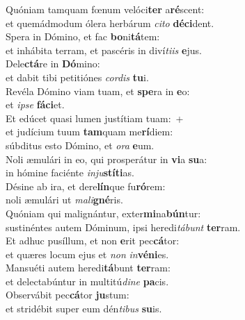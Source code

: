 \evenverse Quóniam tamquam fœnum velóci\textbf{ter} a\textbf{ré}scent:~\*\\
\evenverse et quemádmodum ólera herbárum \textit{ci}\textit{to} \textbf{dé}\textbf{ci}dent.\\
\oddverse Spera in Dómino, et fac \textbf{bo}ni\textbf{tá}tem:~\*\\
\oddverse et inhábita terram, et pascéris in diví\textit{ti}\textit{is} \textbf{e}jus.\\
\evenverse Dele\textbf{ctá}re in \textbf{Dó}mino:~\*\\
\evenverse et dabit tibi petitiónes \textit{cor}\textit{dis} \textbf{tu}i.\\
\oddverse Revéla Dómino viam tuam, et \textbf{spe}ra in \textbf{e}o:~\*\\
\oddverse et \textit{i}\textit{pse} \textbf{fá}\textbf{ci}et.\\
\evenverse Et edúcet quasi lumen justítiam tuam:~+\\
\evenverse  et judícium tuum \textbf{tam}quam me\textbf{rí}diem:~\*\\
\evenverse súbditus esto Dómino, et \textit{o}\textit{ra} \textbf{e}um.\\
\oddverse Noli æmulári in eo, qui prosperátur in \textbf{vi}a \textbf{su}a:~\*\\
\oddverse in hómine faciénte \textit{in}\textit{ju}\textbf{stí}\textbf{ti}as.\\
\evenverse Désine ab ira, et dere\textbf{lín}que fu\textbf{ró}rem:~\*\\
\evenverse noli æmulári ut \textit{ma}\textit{li}\textbf{gné}ris.\\
\oddverse Quóniam qui malignántur, exter\textbf{mi}na\textbf{bún}tur:~\*\\
\oddverse sustinéntes autem Dóminum, ipsi heredi\textit{tá}\textit{bunt} \textbf{ter}ram.\\
\evenverse Et adhuc pusíllum, et non \textbf{e}rit pec\textbf{cá}tor:~\*\\
\evenverse et quæres locum ejus et \textit{non} \textit{in}\textbf{vé}\textbf{ni}es.\\
\oddverse Mansuéti autem heredi\textbf{tá}bunt \textbf{ter}ram:~\*\\
\oddverse et delectabúntur in multitú\textit{di}\textit{ne} \textbf{pa}cis.\\
\evenverse Observábit pec\textbf{cá}tor \textbf{ju}stum:~\*\\
\evenverse et stridébit super eum dén\textit{ti}\textit{bus} \textbf{su}is.\\
